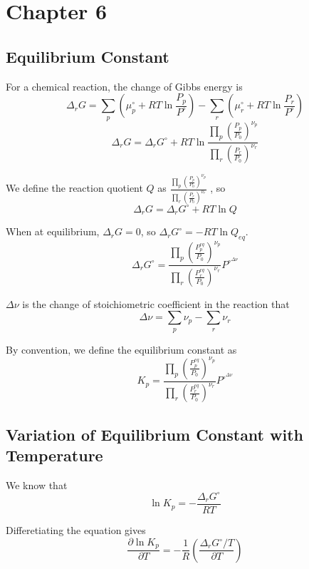\documentclass[letterpaper]{article}
\newcommand{\zero}{^\circ}
\begin{document}
\newpage
\section*{Chapter 6}
\subsection*{Equilibrium Constant}
For a chemical reaction, the change of Gibbs energy is
\begin{equation*}
    \Delta_rG=\sum_p(\mu_p\zero+RT\ln\frac{P_p}{P\zero})-\sum_r(\mu_r\zero+RT\ln\frac{P_r}{P\zero})
\end{equation*}
\begin{equation*}
    \Delta_rG=\Delta_rG\zero+RT\ln\frac{\prod_p(\frac{P_p}{P_0})^{\nu_p}}{\prod_r(\frac{P_r}{P_0})^{\nu_r}}
\end{equation*}

We define the reaction quotient $Q$ as $\frac{\prod_p(\frac{P_p}{P_0})^{\nu_p}}{\prod_r(\frac{P_r}{P_0})^{\nu_r}}$
, so
\begin{equation*}
    \Delta_rG=\Delta_rG\zero+RT\ln Q
\end{equation*}

When at equilibrium, $\Delta_rG=0$, so $\Delta_rG\zero=-RT\ln Q_{eq}$.
\begin{equation*}
    \Delta_rG\zero=\frac{\prod_p(\frac{P_p^{eq}}{P_0})^{\nu_p}}
    {\prod_r(\frac{P_r^{eq}}{P_0})^{\nu_r}}P\zero^{\Delta\nu}
\end{equation*}

$\Delta\nu$ is the change of stoichiometric coefficient in the reaction that
\begin{equation*}
    \Delta\nu = \sum_p\nu_p-\sum_r\nu_r
\end{equation*}

By convention, we define the equilibrium constant as
\begin{equation*}
    K_p=\frac{\prod_p(\frac{P_p^{eq}}{P_0})^{\nu_p}}
    {\prod_r(\frac{P_r^{eq}}{P_0})^{\nu_r}}P\zero^{\Delta\nu}
\end{equation*}
\subsection*{Variation of Equilibrium Constant with Temperature}
We know that
\begin{equation*}
    \ln K_p=-\frac{\Delta_rG\zero}{RT}
\end{equation*}

Differetiating the equation gives
\begin{equation*}
    \frac{\partial\ln K_p}{\partial T}=-\frac{1}{R}(\frac{\Delta_rG\zero/T}{\partial T})
\end{equation*}
\end{document}
